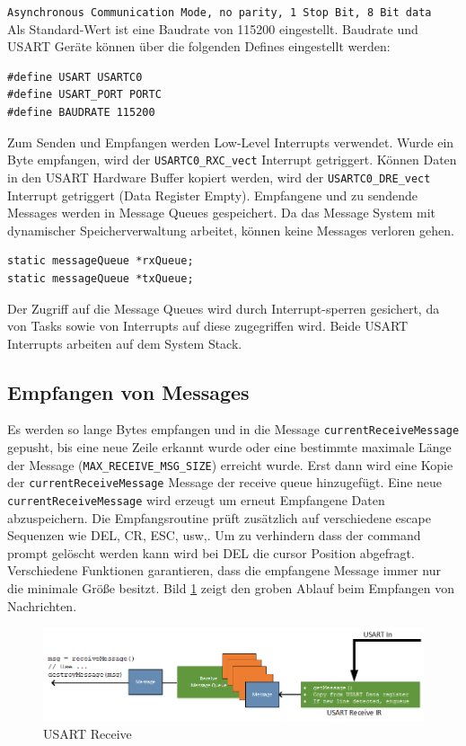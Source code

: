 \documentclass[fontsize=12pt, toc=bibliography, notitlepage]{scrreprt}
\begin{document}
\lstinline$Asynchronous Communication Mode, no parity, 1 Stop Bit, 8 Bit data$\\

Als Standard-Wert ist eine Baudrate von 115200 eingestellt. Baudrate und USART Geräte können über die folgenden Defines eingestellt werden:

\begin{lstlisting}
#define USART USARTC0
#define USART_PORT PORTC
#define BAUDRATE 115200
\end{lstlisting}

Zum Senden und Empfangen werden Low-Level Interrupts verwendet. Wurde ein Byte empfangen, wird der \lstinline$USARTC0_RXC_vect$ Interrupt getriggert. Können Daten in den USART Hardware Buffer kopiert werden, wird der \lstinline$USARTC0_DRE_vect$ Interrupt getriggert (Data Register Empty). Empfangene und zu sendende Messages werden in Message Queues gespeichert. Da das Message System mit dynamischer Speicherverwaltung arbeitet, können keine Messages verloren gehen.

\begin{lstlisting}
static messageQueue *rxQueue;
static messageQueue *txQueue;
\end{lstlisting}

Der Zugriff auf die Message Queues wird durch Interrupt-sperren gesichert, da von Tasks sowie von Interrupts auf diese zugegriffen wird. Beide USART Interrupts arbeiten auf dem System Stack.

\subsection{Empfangen von Messages}
Es werden so lange Bytes empfangen und in die Message \lstinline$currentReceiveMessage$ gepusht, bis eine neue Zeile erkannt wurde oder eine bestimmte maximale Länge der Message (\lstinline$MAX_RECEIVE_MSG_SIZE$) erreicht wurde. Erst dann wird eine Kopie der \lstinline$currentReceiveMessage$ Message der receive queue hinzugefügt. Eine neue \lstinline$currentReceiveMessage$ wird erzeugt um erneut Empfangene Daten abzuspeichern. Die Empfangsroutine prüft zusätzlich auf verschiedene escape Sequenzen wie DEL, CR, ESC, usw,. Um zu verhindern dass der command prompt gelöscht werden kann wird bei DEL die cursor Position abgefragt. Verschiedene Funktionen garantieren, dass die empfangene Message immer nur die minimale Größe besitzt. Bild \ref{fig:usart_receive} zeigt den groben Ablauf beim Empfangen von Nachrichten.

\begin{figure}[H]
	\centering
	\includegraphics[width=450px]{images/UsartIn.png}
	\caption{USART Receive}
	\label{fig:usart_receive}
\end{figure}
\end{document}
